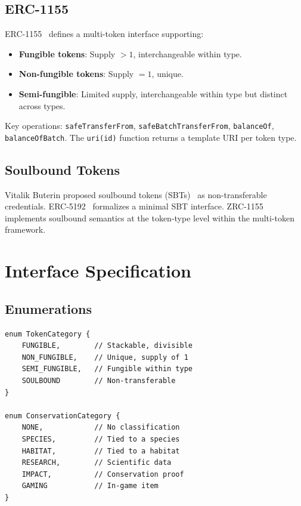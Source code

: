 \documentclass[11pt,letterpaper]{article}
\begin{document}
\subsection{ERC-1155}

ERC-1155~\cite{erc1155} defines a multi-token interface supporting:

\begin{itemize}
    \item \textbf{Fungible tokens}: Supply $> 1$, interchangeable within type.
    \item \textbf{Non-fungible tokens}: Supply $= 1$, unique.
    \item \textbf{Semi-fungible}: Limited supply, interchangeable within type but distinct across types.
\end{itemize}

Key operations: \texttt{safeTransferFrom}, \texttt{safeBatchTransferFrom}, \texttt{balanceOf}, \texttt{balanceOfBatch}. The \texttt{uri(id)} function returns a template URI per token type.

\subsection{Soulbound Tokens}

Vitalik Buterin proposed soulbound tokens (SBTs)~\cite{sbt2022} as non-transferable credentials. ERC-5192~\cite{erc5192} formalizes a minimal SBT interface. ZRC-1155 implements soulbound semantics at the token-type level within the multi-token framework.

\section{Interface Specification}
\label{sec:interface}

\subsection{Enumerations}

\begin{lstlisting}[language=Solidity,caption=Token and conservation category enums]
enum TokenCategory {
    FUNGIBLE,        // Stackable, divisible
    NON_FUNGIBLE,    // Unique, supply of 1
    SEMI_FUNGIBLE,   // Fungible within type
    SOULBOUND        // Non-transferable
}

enum ConservationCategory {
    NONE,            // No classification
    SPECIES,         // Tied to a species
    HABITAT,         // Tied to a habitat
    RESEARCH,        // Scientific data
    IMPACT,          // Conservation proof
    GAMING           // In-game item
}
\end{lstlisting}
\end{document}
